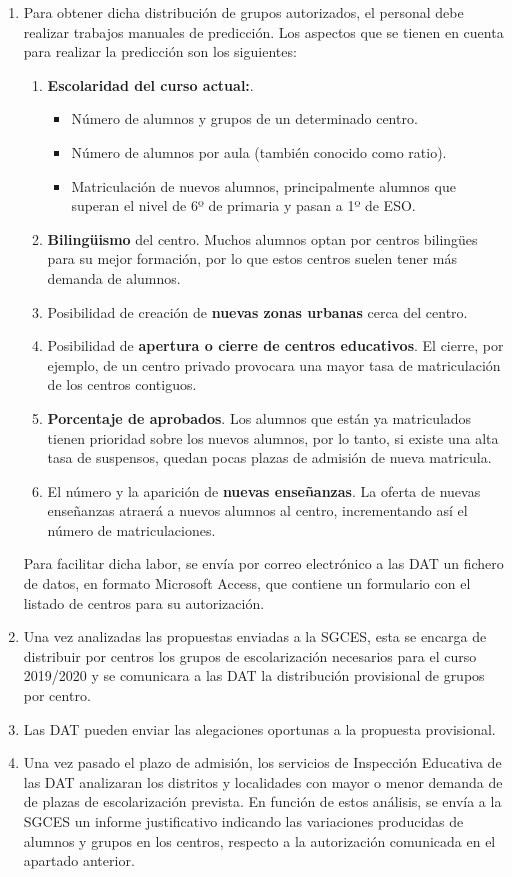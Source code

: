 \begin{enumerate}
	\item Para obtener dicha distribución de grupos autorizados, el personal debe realizar trabajos manuales de predicción. Los aspectos que se tienen en cuenta para realizar la predicción son los siguientes:
	\begin{enumerate}
		\item \textbf{Escolaridad del curso actual:}.
		\begin{itemize}
			\item Número de alumnos y grupos de un determinado centro.
			\item Número de alumnos por aula (también conocido como ratio).
			\item Matriculación de nuevos alumnos, principalmente alumnos que superan el nivel de 6º de primaria y pasan a 1º de ESO.
		\end{itemize}	
		\item \textbf{Bilingüismo} del centro. Muchos alumnos optan por centros bilingües para su mejor formación, por lo que estos centros suelen tener más demanda de alumnos.
		\item Posibilidad de creación de \textbf{nuevas zonas urbanas} cerca del centro. 
		\item Posibilidad de \textbf{apertura o cierre de centros educativos}. El cierre, por ejemplo, de un centro privado provocara una mayor tasa de matriculación de los centros contiguos. 
		\item \textbf{Porcentaje de aprobados}. Los alumnos que están ya matriculados tienen prioridad sobre los nuevos alumnos, por lo tanto, si existe una alta tasa de suspensos, quedan pocas plazas de admisión de nueva matricula.
		\item El número y la aparición de \textbf{nuevas enseñanzas}. La oferta de nuevas enseñanzas atraerá a nuevos alumnos al centro, incrementando así el número de matriculaciones.
	\end{enumerate}
	
	Para facilitar dicha labor, se envía por correo electrónico a las DAT un fichero de datos, en formato Microsoft Access, que contiene un formulario con el listado de centros para su autorización.
	\item Una vez analizadas las propuestas enviadas a la SGCES, esta se encarga de distribuir por centros los grupos de escolarización necesarios para el curso 2019/2020 y se comunicara a las DAT la distribución provisional de grupos por centro.
	\item Las DAT pueden enviar las alegaciones oportunas a la propuesta provisional.
	\item Una vez pasado el plazo de admisión, los servicios de Inspección Educativa de las DAT analizaran los distritos y localidades con mayor o menor demanda de de plazas de escolarización prevista. En función de estos análisis, se envía a la SGCES un informe justificativo indicando las variaciones producidas de alumnos y grupos en los centros, respecto a la autorización comunicada en el apartado anterior.
\end{enumerate}

